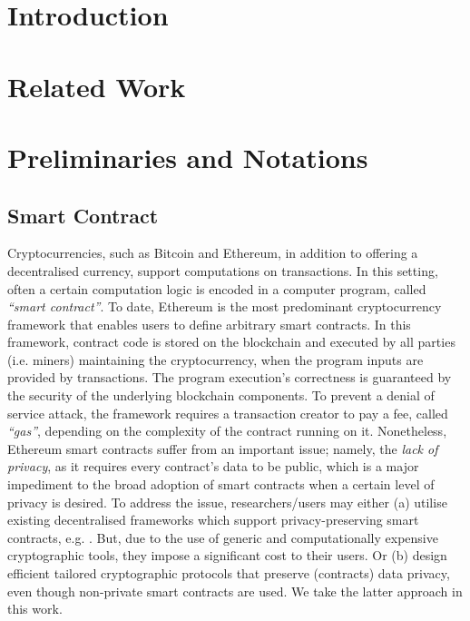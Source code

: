 


\section{Introduction}

\section{Related Work}

\section{Preliminaries and Notations} \label{preliminaries}




\subsection{Smart Contract} Cryptocurrencies, such as Bitcoin and Ethereum, in addition to offering a decentralised currency,  support  computations on  transactions. In this setting, often a certain computation logic is encoded in a computer program, called \emph{``smart contract''}. To date, Ethereum is the most predominant cryptocurrency framework that enables users to define arbitrary smart contracts. In this framework,  contract code is stored on the blockchain and  executed by all parties (i.e. miners) maintaining the cryptocurrency,  when the program inputs are provided by transactions. The program execution's  correctness  is  guaranteed by the security of the underlying blockchain components. To prevent  a denial of service attack, the framework requires a transaction creator to pay a  fee, called \emph{``gas''}, depending on the complexity of the contract running on  it.  Nonetheless,  Ethereum smart contracts suffer from an important   issue; namely, the \emph{lack of privacy}, as it requires  every contract's data to be public, which is a major impediment  to  the broad adoption of  smart contracts when a certain level of privacy is desired. To address the issue, researchers/users may either (a)  utilise existing decentralised frameworks  which support privacy-preserving smart contracts, e.g. \cite{KosbaMSWP16}. But, due to the use of generic and computationally expensive cryptographic tools,  they impose a significant cost to their users. Or (b)  design  efficient tailored cryptographic protocols  that preserve (contracts) data privacy, even though non-private smart contracts are used. We take the latter approach in this work. 



